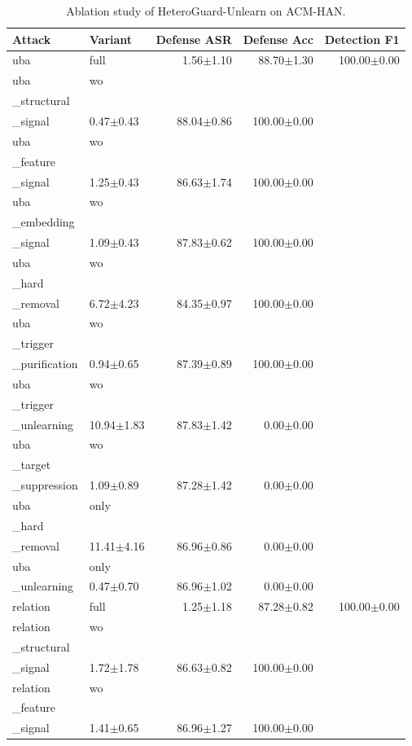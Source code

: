 \begin{table}[t]
\centering
\caption{Ablation study of HeteroGuard-Unlearn on ACM-HAN.}
\label{tab:ablation_acm_han}
\begin{tabular}{llrrr}
\toprule
Attack & Variant & Defense ASR & Defense Acc & Detection F1 \\
\midrule
uba & full & 1.56$\pm$1.10 & 88.70$\pm$1.30 & 100.00$\pm$0.00 \\
uba & wo\\_structural\\_signal & 0.47$\pm$0.43 & 88.04$\pm$0.86 & 100.00$\pm$0.00 \\
uba & wo\\_feature\\_signal & 1.25$\pm$0.43 & 86.63$\pm$1.74 & 100.00$\pm$0.00 \\
uba & wo\\_embedding\\_signal & 1.09$\pm$0.43 & 87.83$\pm$0.62 & 100.00$\pm$0.00 \\
uba & wo\\_hard\\_removal & 6.72$\pm$4.23 & 84.35$\pm$0.97 & 100.00$\pm$0.00 \\
uba & wo\\_trigger\\_purification & 0.94$\pm$0.65 & 87.39$\pm$0.89 & 100.00$\pm$0.00 \\
uba & wo\\_trigger\\_unlearning & 10.94$\pm$1.83 & 87.83$\pm$1.42 & 0.00$\pm$0.00 \\
uba & wo\\_target\\_suppression & 1.09$\pm$0.89 & 87.28$\pm$1.42 & 0.00$\pm$0.00 \\
uba & only\\_hard\\_removal & 11.41$\pm$4.16 & 86.96$\pm$0.86 & 0.00$\pm$0.00 \\
uba & only\\_unlearning & 0.47$\pm$0.70 & 86.96$\pm$1.02 & 0.00$\pm$0.00 \\
relation & full & 1.25$\pm$1.18 & 87.28$\pm$0.82 & 100.00$\pm$0.00 \\
relation & wo\\_structural\\_signal & 1.72$\pm$1.78 & 86.63$\pm$0.82 & 100.00$\pm$0.00 \\
relation & wo\\_feature\\_signal & 1.41$\pm$0.65 & 86.96$\pm$1.27 & 100.00$\pm$0.00 \\

\end{tabular}
\end{table}
